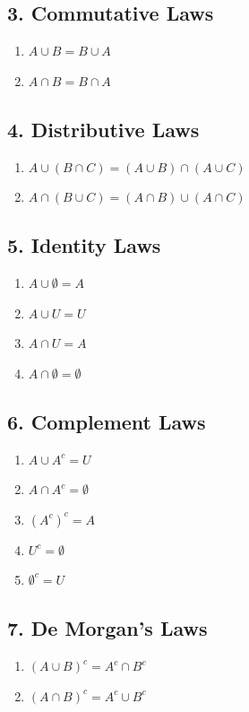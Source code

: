 \subsection*{3. Commutative Laws}
\begin{enumerate}
    \item $ A \cup B = B \cup A$
    \item $ A \cap B = B \cap A$
\end{enumerate}


\subsection*{4. Distributive Laws}
\begin{enumerate}
    \item $A \cup (B \cap C) = (A \cup B)\cap(A \cup C)$
    \item $A \cap (B \cup C) = (A \cap B)\cup(A \cap C)$
\end{enumerate}

\subsection*{5. Identity Laws}
\begin{enumerate}
    \item $A \cup \emptyset = A$
    \item $A \cup U = U$
    \item $A \cap U = A$
    \item $A \cap \emptyset = \emptyset$
\end{enumerate}

\subsection*{6. Complement Laws}
\begin{enumerate}
    \item $A \cup A^c = U$
    \item $A \cap A^c = \emptyset$
    \item $(A^c)^c = A$
    \item $U^c = \emptyset$
    \item $\emptyset^c = U$
\end{enumerate}
\subsection*{7. De Morgan's Laws}
\begin{enumerate}
    \item $(A \cup B)^c = A^c \cap B^c$
    \item $(A \cap B)^c = A^c \cup B^c$
\end{enumerate}
